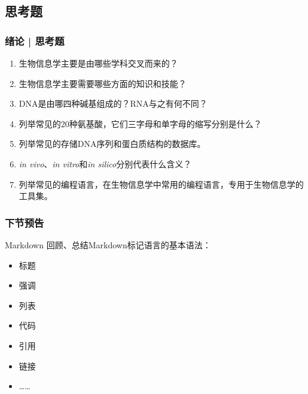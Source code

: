 \subsection{思考题}
\begin{frame}
  \frametitle{绪论 | 思考题}
  \begin{enumerate}
    \item 生物信息学主要是由哪些学科交叉而来的？
    \item 生物信息学主要需要哪些方面的知识和技能？
    \item DNA是由哪四种碱基组成的？RNA与之有何不同？
    \item 列举常见的20种氨基酸，它们三字母和单字母的缩写分别是什么？
    \item 列举常见的存储DNA序列和蛋白质结构的数据库。
    \item \textit{in vivo}、\textit{in vitro}和\textit{in silico}分别代表什么含义？
    \item 列举常见的编程语言，在生物信息学中常用的编程语言，专用于生物信息学的工具集。
  \end{enumerate}
\end{frame}

\begin{frame}
  \frametitle{下节预告}
  \begin{block}{Markdown}
    回顾、总结Markdown标记语言的基本语法：
    \begin{itemize}
      \item 标题
      \item 强调
      \item 列表
      \item 代码
      \item 引用
      \item 链接
      \item ……
    \end{itemize}
  \end{block}
\end{frame}


